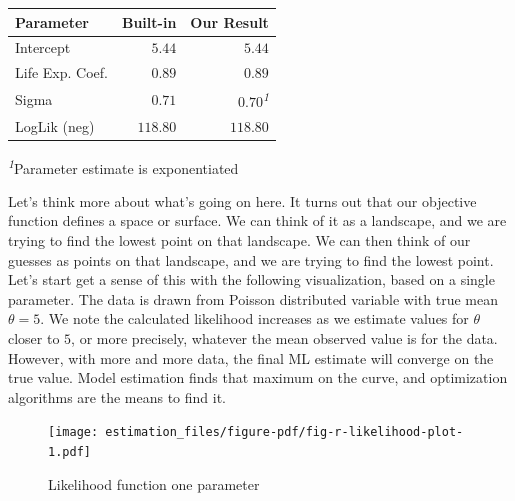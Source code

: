 \documentclass[
  letterpaper,
]{krantz}
\begin{document}
\begin{table}

\caption{\label{tbl-r-likelihood}\textbf{?(caption)}}\begin{minipage}[t]{\linewidth}
\subcaption{\label{tbl-r-likelihood-1}}

{\centering 

\setlength{\LTpost}{0mm}
\begin{longtable*}{lrr}
\toprule
Parameter & Built-in & Our Result \\ 
\midrule
Intercept & $5.44$ & $5.44$ \\ 
Life Exp. Coef. & $0.89$ & $0.89$ \\ 
Sigma & $0.71$ & $0.70$\textsuperscript{\textit{1}} \\ 
LogLik (neg) & $118.80$ & $118.80$ \\ 
\bottomrule
\end{longtable*}
\begin{minipage}{\linewidth}
\textsuperscript{\textit{1}}Parameter estimate is exponentiated\\
\end{minipage}

}

\end{minipage}%

\end{table}

Let's think more about what's going on here. It turns out that our
objective function defines a space or surface. We can think of it as a
landscape, and we are trying to find the lowest point on that landscape.
We can then think of our guesses as points on that landscape, and we are
trying to find the lowest point. Let's start get a sense of this with
the following visualization, based on a single parameter. The data is
drawn from Poisson distributed variable with true mean \(\theta=5\). We
note the calculated likelihood increases as we estimate values for
\(\theta\) closer to \(5\), or more precisely, whatever the mean
observed value is for the data. However, with more and more data, the
final ML estimate will converge on the true value. Model estimation
finds that maximum on the curve, and optimization algorithms are the
means to find it.

\begin{figure}

{\centering \texttt{[image: estimation\_files/figure-pdf/fig-r-likelihood-plot-1.pdf]}

}

\caption{\label{fig-r-likelihood-plot}Likelihood function one parameter}

\end{figure}
\end{document}
